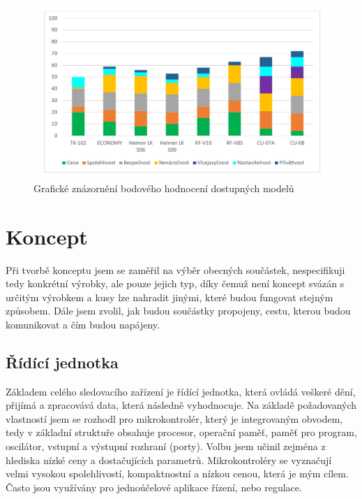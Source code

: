 \documentclass[FM,MP]{tulthesis}  %
\begin{document}
\begin{figure}[H]
\begin{center}
\includegraphics[width=\textwidth]{graphs/graf_bodoveHodnoceni.pdf}
\caption{Grafické znázornění bodového hodnocení dostupných modelů}
\label{image}
\end{center}
\end{figure}


\chapter{Koncept}
Při tvorbě konceptu jsem se zaměřil na výběr obecných součástek, nespecifikuji tedy konkrétní výrobky, ale pouze jejich typ, díky čemuž není koncept svázán s určitým výrobkem a kusy lze nahradit jinými, které budou fungovat stejným způsobem. Dále jsem zvolil, jak budou součástky propojeny, cestu, kterou budou komunikovat a čím budou napájeny.

\section{Řídící jednotka}
Základem celého sledovacího zařízení je řídící jednotka, která ovládá veškeré dění, přijímá a zpracovává data, která následně vyhodnocuje. Na základě požadovaných vlastností jsem se rozhodl pro mikrokontrolér, který je integrovaným obvodem, tedy v základní struktuře obsahuje procesor, operační paměť, paměť pro program, oscilátor, vstupní a výstupní rozhraní (porty). Volbu jsem učinil zejména z hlediska nízké ceny a dostačujících parametrů. Mikrokontroléry se vyznačují velmi vysokou spolehlivostí, kompaktnostní a nízkou cenou, která je mým cílem. Často jsou využívány pro jednoúčelové aplikace řízení, nebo regulace.
\end{document}
